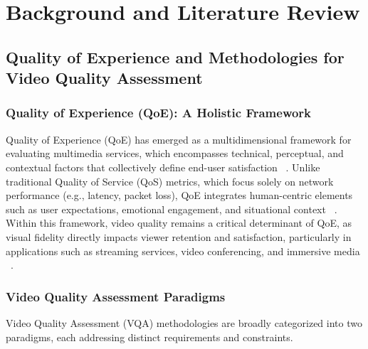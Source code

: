 \chapter{Background and Literature Review} \label{chap:ch2}

\section{Quality of Experience and Methodologies for Video Quality Assessment}  

\subsection{Quality of Experience (QoE): A Holistic Framework}  
Quality of Experience (QoE) has emerged as a multidimensional framework for evaluating multimedia services, 
which encompasses technical, perceptual, and contextual factors that collectively define end-user satisfaction ~\cite{itu2012recommendation}. 
Unlike traditional Quality of Service (QoS) metrics, which focus solely on network performance (e.g., latency, packet loss), 
QoE integrates human-centric elements such as user expectations, emotional engagement, and situational context ~\cite{brunnstrom2013qualinet}. 
Within this framework, video quality remains a critical determinant of QoE, as visual fidelity directly impacts viewer retention and satisfaction, 
particularly in applications such as streaming services, video conferencing, and immersive media ~\cite{wang2004ssim}.

\subsection{Video Quality Assessment Paradigms}  
Video Quality Assessment (VQA) methodologies are broadly categorized into two paradigms, each addressing distinct requirements and constraints.  


